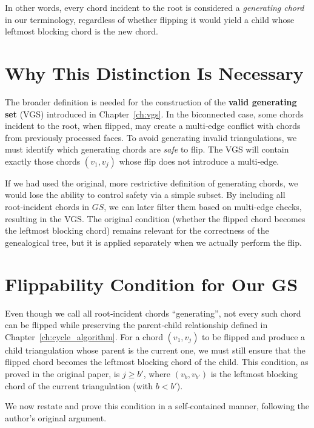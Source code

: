 In other words, every chord incident to the root is considered a \emph{generating chord} in our terminology, regardless of whether flipping it would yield a child whose leftmost blocking chord is the new chord.

\section{Why This Distinction Is Necessary}
\label{sec:why_distinction}

The broader definition is needed for the construction of the \textbf{valid generating set} (VGS) introduced in Chapter~\ref{ch:vgs}. 
In the biconnected case, some chords incident to the root, when flipped, may create a multi‑edge conflict with chords from previously processed faces. 
To avoid generating invalid triangulations, we must identify which generating chords are \emph{safe} to flip. 
The VGS will contain exactly those chords \((v_1, v_j)\) whose flip does not introduce a multi‑edge.

If we had used the original, more restrictive definition of generating chords, we would lose the ability to control safety via a simple subset. 
By including all root‑incident chords in \(GS\), we can later filter them based on multi‑edge checks, resulting in the VGS. 
The original condition (whether the flipped chord becomes the leftmost blocking chord) remains relevant for the correctness of the genealogical tree, but it is applied separately when we actually perform the flip.

\section{Flippability Condition for Our GS}
\label{sec:flippability_condition}

Even though we call all root‑incident chords ``generating'', not every such chord can be flipped while preserving the parent‑child relationship defined in Chapter~\ref{ch:cycle_algorithm}. 
For a chord \((v_1, v_j)\) to be flipped and produce a child triangulation whose parent is the current one, we must still ensure that the flipped chord becomes the leftmost blocking chord of the child. 
This condition, as proved in the original paper, is \(j \ge b'\), where \((v_b, v_{b'})\) is the leftmost blocking chord of the current triangulation (with \(b < b'\)).

We now restate and prove this condition in a self‑contained manner, following the author’s original argument.

